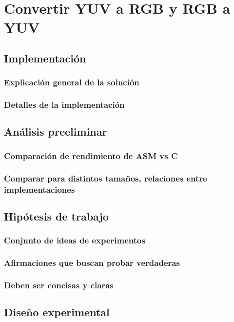 \section{Convertir YUV a RGB y RGB a YUV}

\subsection{Implementación}
\subsubsection*{Explicación general de la solución}
\subsubsection*{Detalles de la implementación}


\subsection{Análisis preeliminar}
\subsubsection*{Comparación de rendimiento de ASM vs C}
\subsubsection*{Comparar para distintos tamaños, relaciones entre implementaciones}

\subsection{Hipótesis de trabajo}
\subsubsection*{Conjunto de ideas de experimentos}
\subsubsection*{Afirmaciones que buscan probar verdaderas}
\subsubsection*{Deben ser concisas y claras}

\subsection{Diseño experimental}

